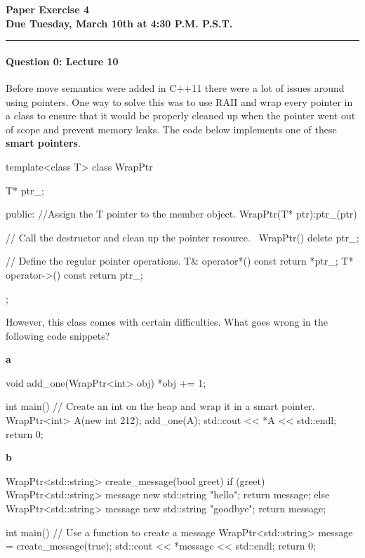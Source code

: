 \documentclass[12pt,letterpaper,twoside]{article}
\begin{document}
{\centering \textbf{Paper Exercise 4\\ Due Tuesday, March 10th at 4:30
    P.M. P.S.T. \\}}
\vspace*{-8pt}\noindent\rule{\linewidth}{1pt}

\paragraph{Question 0: Lecture 10}

Before move semantics were added in C++11 there were a lot of issues around using pointers. One way to solve this was to use RAII and wrap every pointer in a class to ensure that it would be properly cleaned up when the pointer went out of scope and prevent memory leaks. The code below implements one of these \textbf{smart pointers}.

\begin{cpp}
template<class T>
class WrapPtr {
	T* ptr_;

	public:
	//Assign the T pointer to the member object.
	WrapPtr(T* ptr):ptr_(ptr)	{

	}
	// Call the destructor and clean up the pointer resource.
	~WrapPtr() {
		delete ptr_;
	}

	// Define the regular pointer operations.
	T& operator*() const { return *ptr_; }
	T* operator->() const { return ptr_; }
};	
\end{cpp}

However, this class comes with certain difficulties. What goes wrong in the following code snippets?

\textbf{a}
\begin{cpp}
void add_one(WrapPtr<int> obj) {
  *obj += 1;
}

int main() {
  // Create an int on the heap and wrap it in a smart pointer.
  WrapPtr<int> A(new int {212});
  add_one(A);
  std::cout << *A << std::endl;
  return 0;
}
\end{cpp}

\begin{solution}

\end{solution}



\textbf{b}
\begin{cpp}
WrapPtr<std::string> create_message(bool greet)
{
  if (greet) {
    WrapPtr<std::string> message {new std::string {"hello"}};
    return message;
  } else {
    WrapPtr<std::string> message {new std::string {"goodbye"}};
    return message;
  }
}

int main()
{
  // Use a function to create a message
  WrapPtr<std::string> message = create_message(true);
  std::cout << *message << std::endl;
  return 0;
}
\end{cpp}
\end{document}
